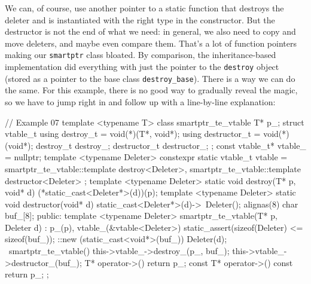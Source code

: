 We can, of course, use another pointer to a static function that destroys the deleter and is instantiated with the right type in the constructor. But the destructor is not the end of what we need: in general, we also need to copy and move deleters, and maybe even compare them. That's a lot of function pointers making our \texttt{smartptr} class bloated. By comparison, the inheritance-based implementation did everything with just the pointer to the \texttt{destroy} object (stored as a pointer to the base class \texttt{destroy\_base}). There is a way we can do the same. For this example, there is no good way to gradually reveal the magic, so we have to jump right in and follow up with a line-by-line explanation:

\begin{code}
// Example 07
template <typename T>
class smartptr_te_vtable {
  T* p_;
  struct vtable_t {
    using destroy_t = void(*)(T*, void*);
    using destructor_t = void(*)(void*);
    destroy_t destroy_;
    destructor_t destructor_;
  };
  const vtable_t* vtable_ = nullptr;
  template <typename Deleter>
  constexpr static vtable_t vtable = {
    smartptr_te_vtable::template destroy<Deleter>,
    smartptr_te_vtable::template destructor<Deleter>
  };
  template <typename Deleter>
  static void destroy(T* p, void* d) {
    (*static_cast<Deleter*>(d))(p);
  }
  template <typename Deleter>
  static void destructor(void* d) {
    static_cast<Deleter*>(d)->~Deleter();
  }
  alignas(8) char buf_[8];
  public:
  template <typename Deleter>
  smartptr_te_vtable(T* p, Deleter d)
    : p_(p), vtable_(&vtable<Deleter>)
  {
    static_assert(sizeof(Deleter) <= sizeof(buf_));
    ::new (static_cast<void*>(buf_)) Deleter(d);
  }
  ~smartptr_te_vtable() {
    this->vtable_->destroy_(p_, buf_);
    this->vtable_->destructor_(buf_);
  }
  T* operator->() { return p_; }
  const T* operator->() const { return p_; }
};
\end{code}

